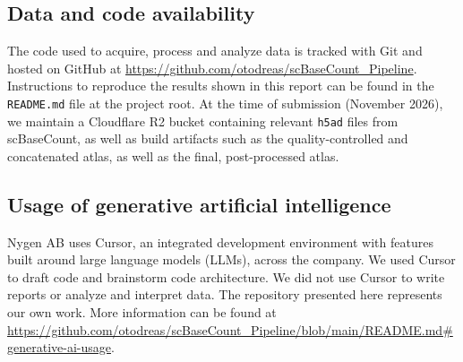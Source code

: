 \documentclass[10pt,letterpaper]{article}
\begin{document}
\subsection*{Data and code availability}

The code used to acquire, process and analyze data is tracked with Git and hosted on GitHub at \url{https://github.com/otodreas/scBaseCount_Pipeline}. Instructions to reproduce the results shown in this report can be found in the \texttt{README.md} file at the project root. At the time of submission (November 2026), we maintain a Cloudflare R2 bucket containing relevant \texttt{h5ad} files from scBaseCount, as well as build artifacts such as the quality-controlled and concatenated atlas, as well as the final, post-processed atlas.

\subsection*{Usage of generative artificial intelligence}

Nygen AB uses Cursor, an integrated development environment with features built around large language models (LLMs), across the company. We used Cursor to draft code and brainstorm code architecture. We did not use Cursor to write reports or analyze and interpret data. The repository presented here represents our own work. More information can be found at \url{https://github.com/otodreas/scBaseCount_Pipeline/blob/main/README.md#generative-ai-usage}.




\end{document}
